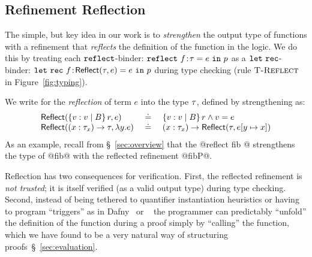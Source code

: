 
\subsection{Refinement Reflection}
\label{subsec:logicalannotations}
%
The simple, but key idea in our work is to
\emph{strengthen} the output type of functions
with a refinement that \emph{reflects} the
definition of the function in the logic.
%
We do this by treating each
%
$\mathtt{reflect}$-binder:
%
${{\mathtt{reflect}}\ {f\!:\!\tau} = e\ \mathtt{in}\ {p}}$
%
as a $\mathtt{let\ rec}$-binder:
%
${{\mathtt{let\ rec}}\ {f\!:\!\mathsf{Reflect}(\tau, e)} = e\ \mathtt{in}\ {p}}$
%
during type checking (rule $\textsc{T-Reflect}$ in Figure~\ref{fig:typing}).

%
We write  for the \emph{reflection}
of term $e$ into the type $\tau$,  defined by strengthening
\typ as:
%
$$
\begin{array}{lcl}
\mathsf{Reflect}(\left\lbrace v : v\mid B\right\rbrace{r}, e)
  & \ \doteq\ 
  & \left\lbrace v : v\mid B\right\rbrace{r \land v = e}\\
\mathsf{Reflect}({(x:\tau_x)} \rightarrow \tau, \lambda y. e)
  & \ \doteq\ 
  & {(x:\tau_x)} \rightarrow \mathsf{Reflect}(\tau, e[{{y} \mapsto {x}}])
\end{array}
$$
%
As an example, recall from \S~\ref{sec:overview}
that the @reflect fib @ strengthens the type of
@fib@ with the reflected refinement @fibP@.


%
Reflection has two consequences for verification.
%
First, the reflected refinement is \emph{not trusted};
it is itself verified (as a valid output type)
during type checking.
%
Second, instead of being tethered to quantifier
instantiation heuristics or having to program
``triggers'' as in Dafny~\citep{dafny} or
\fstar~\citep{fstar}
%
the programmer can predictably ``unfold'' the
definition of the function during a proof simply
by ``calling'' the function, which we have found
to be a very natural way of structuring
proofs~\S~\ref{sec:evaluation}.


